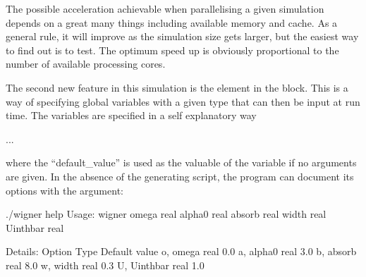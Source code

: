 \documentclass[letterpaper,10pt,english]{sphinxmanual}
\begin{document}
\sphinxAtStartPar
The possible acceleration achievable when parallelising a given simulation depends on a great many things including available memory and cache.  As a general rule, it will improve as the simulation size gets larger, but the easiest way to find out is to test.  The optimum speed up is obviously proportional to the number of available processing cores.

\ignorespaces 
\sphinxAtStartPar
The second new feature in this simulation is the  element in the  block.  This is a way of specifying global variables with a given type that can then be input at run time.  The variables are specified in a self explanatory way

\begin{sphinxVerbatim}[commandchars=\\\{\}]
      
    ...
      
\end{sphinxVerbatim}

\sphinxAtStartPar
where the “default\_value” is used as the valuable of the variable if no arguments are given.  In the absence of the generating script, the program can document its options with the  argument:

\begin{sphinxVerbatim}[commandchars=\\\{\}]
\PYGZdl{} ./wigner \PYGZhy{}\PYGZhy{}help
Usage: wigner \PYGZhy{}\PYGZhy{}omega \PYGZlt{}real\PYGZgt{} \PYGZhy{}\PYGZhy{}alpha\PYGZus{}0 \PYGZlt{}real\PYGZgt{} \PYGZhy{}\PYGZhy{}absorb \PYGZlt{}real\PYGZgt{} \PYGZhy{}\PYGZhy{}width \PYGZlt{}real\PYGZgt{} \PYGZhy{}\PYGZhy{}Uint\PYGZus{}hbar \PYGZlt{}real\PYGZgt{}

Details:
Option              Type            Default value
\PYGZhy{}o,  \PYGZhy{}\PYGZhy{}omega        real            0.0
\PYGZhy{}a,  \PYGZhy{}\PYGZhy{}alpha\PYGZus{}0      real            3.0
\PYGZhy{}b,  \PYGZhy{}\PYGZhy{}absorb       real            8.0
\PYGZhy{}w,  \PYGZhy{}\PYGZhy{}width        real            0.3
\PYGZhy{}U,  \PYGZhy{}\PYGZhy{}Uint\PYGZus{}hbar    real            1.0
\end{sphinxVerbatim}
\end{document}
